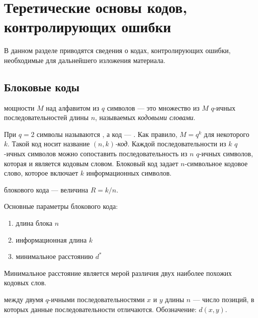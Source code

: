 \chapter{Теретические основы кодов, контролирующих ошибки}

В данном разделе приводятся сведения о кодах, контролирующих ошибки, необходимые для дальнейшего изложения
материала.

\section{Блоковые коды}
\begin{definition} 
 мощности $M$ над алфавитом из $q$ символов --- это множество из $M$ $q$-ичных последовательностей длины $n$, называемых \emph{кодовыми словами}. 
\end{definition}

При $q=2$ символы называются , а код --- . Как правило, $M=q^k$ для некоторого $k$. Такой код носит название \emph{$(n,k)$-код}. Каждой последовательности из $k$ $q$-ичных символов можно сопоставить последовательность из $n$ $q$-ичных символов, которая и является кодовым словом. Блоковый код задает $n$-символьное кодовое слово, которое включает $k$ информационных символов.

\begin{definition}
 блокового кода --- величина $R=k/n$.
\end{definition}

Основные параметры блокового кода:
\begin{enumerate}
\item длина блока $n$
\item информационная длина $k$
\item минимальное расстоянию $d^*$
\end{enumerate}

Минимальное расстояние является мерой различия двух наиболее похожих кодовых слов.

\begin{definition}
 между двумя $q$-ичными последовательностями $x$ и $y$ длины $n$ --- число позиций, в которых данные последовательности отличаются. Обозначение: $d(x, y)$.
\end{definition}

